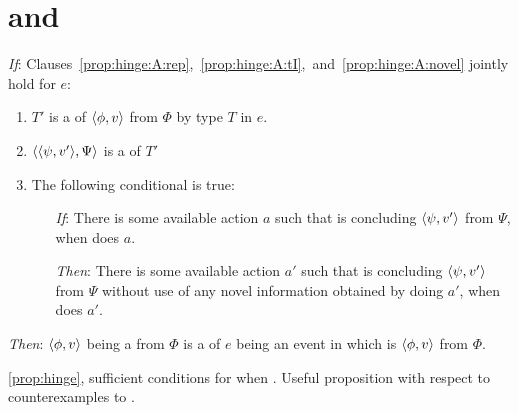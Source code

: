 \chapter{ and \tC{}}
\label{sec:typicalRequs}



\begin{note}
  \begin{proposition}
    \label{prop:hinge}
    \vspace{-\baselineskip}
    \begin{itenum}
    \item[\emph{If}:]
      Clauses~\ref{prop:hinge:A:rep},~\ref{prop:hinge:A:tI},~and~\ref{prop:hinge:A:novel} jointly hold for \(e\):
      \begin{enumerate}[label=\arabic*., ref=(\arabic*)]
      \item
        \label{prop:hinge:A:rep}
        \(T'\) is a \tRep{} of \vAgent{} \tCV{} \(\langle \phi, v \rangle\) from \(\Phi\) by type \(T\) in \(e\).
      \item
        \label{prop:hinge:A:tI}
        \(\langle \langle \psi, v' \rangle, \Psi \rangle\) is a \tI{} of \(T'\)
      \item
        \label{prop:hinge:A:novel}
        The following conditional is true:
        \begin{itemize}
        \item[\emph{If}:]
          There is some available action \(a\) such that \vAgent{} is concluding \(\langle \psi, v' \rangle\) from \(\Psi\), when \vAgent{} does \(a\).
        \item[\emph{Then}:]
          There is some available action \(a'\) such that \vAgent{} is concluding \(\langle \psi, v' \rangle\) from \(\Psi\) without use of any novel information obtained by doing \(a'\), when \vAgent{} does \(a'\).
        \end{itemize}
      \end{enumerate}
    \item[\emph{Then}:]
      \(\langle \phi, v \rangle\) being a \fc{} from \(\Phi\) is a \requ{} of \(e\) being an event in which \vAgent{} is \tCV{} \(\langle \phi, v \rangle\) from \(\Phi\).
    \end{itenum}
    \vspace{-\baselineskip}
  \end{proposition}

  \noindent%
  \autoref{prop:hinge}, sufficient conditions for \requ{} when \tCV{}.
  Useful proposition with respect to counterexamples to \issueConstraint{}.


\end{note}
